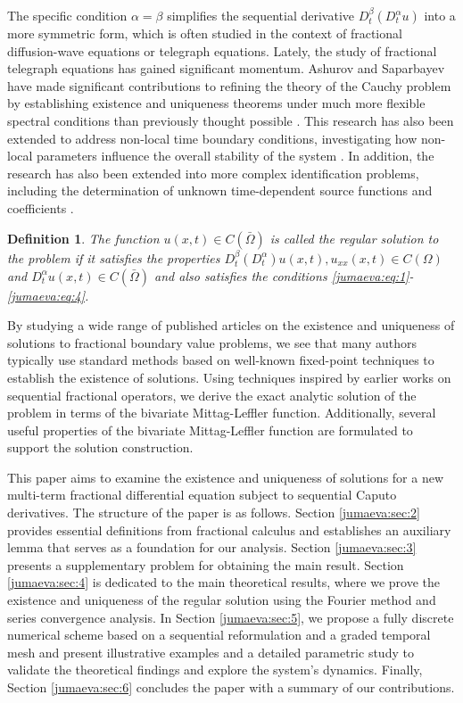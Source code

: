 \documentclass{amsart}
\numberwithin{equation}{section}
\newtheorem{defin}[thm]{Definition}
\begin{document}
 The specific condition $\alpha = \beta$ simplifies the sequential derivative $D_t^\beta(D_t^\alpha u)$ into a more symmetric form, which is often studied in the context of fractional diffusion-wave equations or telegraph equations. Lately, the study of fractional telegraph equations has gained significant momentum. Ashurov and Saparbayev have made significant contributions to refining the theory of the Cauchy problem by establishing existence and uniqueness theorems under much more flexible spectral conditions than previously thought possible  \cite{jumaeva:ref:16, jumaeva:ref:17}. This research has also been extended to address non-local time boundary conditions, investigating how non-local parameters influence the overall stability of the system \cite{jumaeva:ref:18}. In addition, the research has also been extended into more complex identification problems, including the determination of unknown time-dependent source functions and coefficients \cite{jumaeva:ref:19, jumaeva:ref:20}.
 \begin{defin}
     The function $u(x,t)\in C(\bar{\Omega})$ is called the regular solution to the problem if it satisfies the properties $D_t^\beta(D_t^\alpha)u(x,t), u_{xx}(x,t)\in C(\Omega)$ and $D_t^\alpha u(x,t)\in C(\bar{\Omega})$ and also satisfies the conditions \eqref{jumaeva:eq:1}-\eqref{jumaeva:eq:4}. \label{jumaeva:def:1}
 \end{defin}
By studying a wide range of published articles on the existence and uniqueness of solutions to fractional boundary value problems, we see that many authors typically use standard methods based on well-known fixed-point techniques to establish the existence of solutions. Using techniques inspired by earlier works on sequential fractional operators, we derive the exact analytic solution of the problem in terms of the bivariate Mittag-Leffler function. Additionally, several useful properties of the bivariate Mittag-Leffler function are formulated to support the solution construction.

This paper aims to examine the existence and uniqueness of solutions for a new multi-term fractional differential equation subject to sequential Caputo derivatives. The structure of the paper is as follows. Section \ref{jumaeva:sec:2} provides essential definitions from fractional calculus and establishes an auxiliary lemma that serves as a foundation for our analysis. Section \ref{jumaeva:sec:3} presents a supplementary problem for obtaining the main result. Section \ref{jumaeva:sec:4} is dedicated to the main theoretical results, where we prove the existence and uniqueness of the regular solution using the Fourier method and series convergence analysis. In Section \ref{jumaeva:sec:5}, we propose a fully discrete numerical scheme based on a sequential reformulation and a graded temporal mesh and present illustrative examples and a detailed parametric study to validate the theoretical findings and explore the system's dynamics. Finally, Section \ref{jumaeva:sec:6} concludes the paper with a summary of our contributions.
\end{document}
